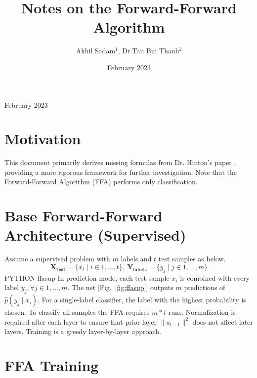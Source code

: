 
\date{February 2023}
\title{Notes on the Forward-Forward Algorithm}
\author{Akhil Sadam$^1$, Dr.Tan Bui Thanh$^2$}
\address{$^1$Department of Aerospace Engineering and Engineering Mechanics, UT Austin\\$^2$The Oden Institute for Computational Sciences, UT Austin}
\begin{indented}
\item[]February 2023
\end{indented}
\section{Motivation}
This document primarily derives missing formulas from Dr. Hinton's paper \cite{FFA23}, providing a more rigorous framework for further investigation.
Note that the Forward-Forward Algorithm (FFA) performs only classification.
\section{Base Forward-Forward Architecture (Supervised)}
Assume a supervised problem with $m$ labels and $t$ test samples as below.
\[
\mathbf{X_{test}} = \{x_i \mid i \in 1,...,t \},\ \mathbf{Y_{labels}} = \{y_j \mid j \in 1,...,m \}
\]
PYTHON ffasup
In prediction mode, each test sample $x_i$ is combined with every label $y_j, \forall j\in 1,...,m$. The net [Fig.~\ref{fig:ffasup}] outputs $m$ predictions of $\hat{p}(y_j \mid x_i)$.
For a single-label classifier, the label with the highest probability is chosen.
To classify all samples the FFA requires $m*t$ runs.
Normalization is required after each layer to ensure that prior layer $\|a_{l-1}\|^2$ does not affect later layers.
Training is a greedy layer-by-layer approach.
\section{FFA Training}
\\
